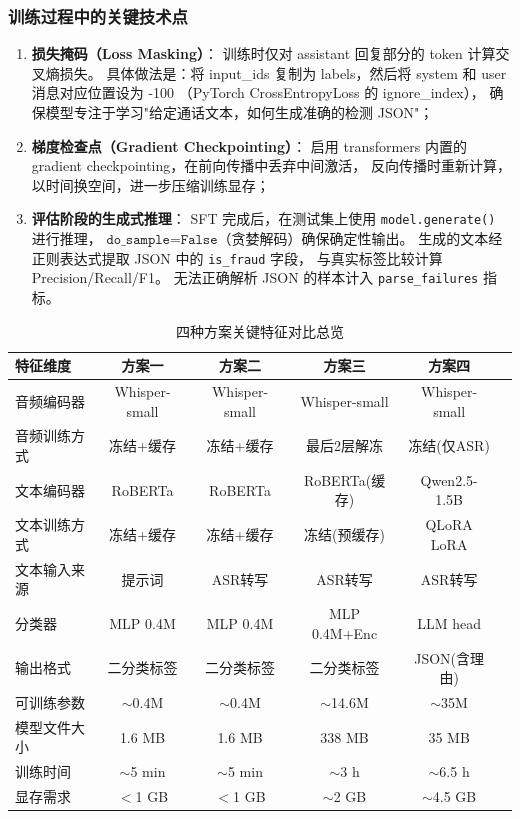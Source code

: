 \documentclass[11pt,a4paper]{ctexart}
\begin{document}
\subsubsection{训练过程中的关键技术点}

\begin{enumerate}[label=(\arabic*)]
  \item \textbf{损失掩码（Loss Masking）}：
  训练时仅对 assistant 回复部分的 token 计算交叉熵损失。
  具体做法是：将 input\_ids 复制为 labels，然后将 system 和 user 消息对应位置设为 -100
  （PyTorch CrossEntropyLoss 的 ignore\_index），
  确保模型专注于学习"给定通话文本，如何生成准确的检测 JSON"；

  \item \textbf{梯度检查点（Gradient Checkpointing）}：
  启用 transformers 内置的 gradient checkpointing，在前向传播中丢弃中间激活，
  反向传播时重新计算，以时间换空间，进一步压缩训练显存；

  \item \textbf{评估阶段的生成式推理}：
  SFT 完成后，在测试集上使用 \texttt{model.generate()} 进行推理，
  $\texttt{do\_sample=False}$（贪婪解码）确保确定性输出。
  生成的文本经正则表达式提取 JSON 中的 \texttt{is\_fraud} 字段，
  与真实标签比较计算 Precision/Recall/F1。
  无法正确解析 JSON 的样本计入 \texttt{parse\_failures} 指标。
\end{enumerate}

\begin{table}[H]\centering
\caption{四种方案关键特征对比总览}
\label{tab:overview}
\begin{tabular}{@{}lccccc@{}}\toprule
\textbf{特征维度} & \textbf{方案一} & \textbf{方案二} & \textbf{方案三} & \textbf{方案四}\\\midrule
音频编码器 & Whisper-small & Whisper-small & Whisper-small & Whisper-small\\
音频训练方式 & 冻结+缓存 & 冻结+缓存 & 最后2层解冻 & 冻结(仅ASR)\\
文本编码器 & RoBERTa & RoBERTa & RoBERTa(缓存) & Qwen2.5-1.5B\\
文本训练方式 & 冻结+缓存 & 冻结+缓存 & 冻结(预缓存) & QLoRA LoRA\\
文本输入来源 & 提示词 & ASR转写 & ASR转写 & ASR转写\\
分类器 & MLP 0.4M & MLP 0.4M & MLP 0.4M+Enc & LLM head\\
输出格式 & 二分类标签 & 二分类标签 & 二分类标签 & JSON(含理由)\\
可训练参数 & $\sim$0.4M & $\sim$0.4M & $\sim$14.6M & $\sim$35M\\
模型文件大小 & 1.6 MB & 1.6 MB & 338 MB & 35 MB\\
训练时间 & $\sim$5 min & $\sim$5 min & $\sim$3 h & $\sim$6.5 h\\
显存需求 & $<$1 GB & $<$1 GB & $\sim$2 GB & $\sim$4.5 GB\\\bottomrule
\end{tabular}
\end{table}
\end{document}
